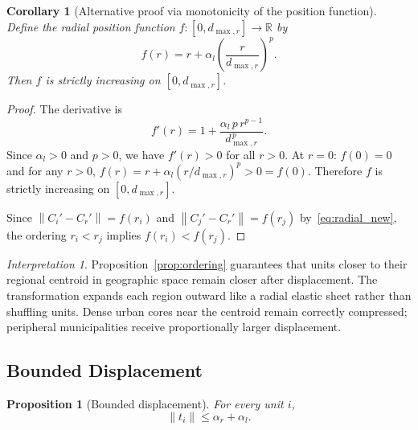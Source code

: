 \documentclass[12pt, a4paper]{article}
\numberwithin{equation}{section}
\theoremstyle{definition}
\theoremstyle{plain}
\newtheorem{proposition}{Proposition}[section]
\newtheorem{corollary}{Corollary}[section]
\theoremstyle{remark}
\newtheorem*{interpretation}{Interpretation}
\newcommand{\R}{\mathbb{R}}
\newcommand{\norm}[1]{\left\|#1\right\|}
\begin{document}
\begin{corollary}[Alternative proof via monotonicity of the position function]
\label{cor:monotone_f}
Define the radial position function $f: [0, d_{\max,r}] \to \R$ by
\begin{equation}
  f(r) = r + \alpha_l\left(\frac{r}{d_{\max,r}}\right)^{\!p}.
  \label{eq:f}
\end{equation}
Then $f$ is strictly increasing on $[0, d_{\max,r}]$.
\end{corollary}

\begin{proof}
The derivative is
\begin{equation}
  f'(r) = 1 + \frac{\alpha_l\,p\,r^{p-1}}{d_{\max,r}^{\,p}}.
  \label{eq:fprime}
\end{equation}
Since $\alpha_l > 0$ and $p > 0$, we have $f'(r) > 0$ for all $r > 0$. At $r = 0$: $f(0) = 0$ and for any $r > 0$, $f(r) = r + \alpha_l(r/d_{\max,r})^p > 0 = f(0)$. Therefore $f$ is strictly increasing on $[0, d_{\max,r}]$.

Since $\norm{C_i' - C_r'} = f(r_i)$ and $\norm{C_j' - C_r'} = f(r_j)$ by~\eqref{eq:radial_new}, the ordering $r_i < r_j$ implies $f(r_i) < f(r_j)$.
\end{proof}

\begin{interpretation}
Proposition~\ref{prop:ordering} guarantees that units closer to their regional centroid in geographic space remain closer after displacement. The transformation expands each region outward like a radial elastic sheet rather than shuffling units. Dense urban cores near the centroid remain correctly compressed; peripheral municipalities receive proportionally larger displacement.
\end{interpretation}


\subsection{Bounded Displacement}

\begin{proposition}[Bounded displacement]
\label{prop:bounded}
For every unit $i$,
\begin{equation}
  \norm{t_i} \leq \alpha_r + \alpha_l.
  \label{eq:bound}
\end{equation}
\end{proposition}
\end{document}
